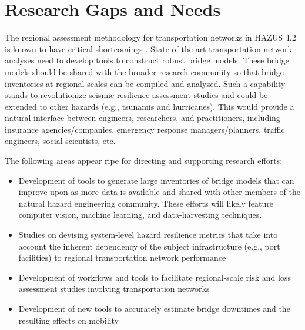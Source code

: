 \section{Research Gaps and Needs}
\label{sec:perf_transport_gaps}

The regional assessment methodology for transportation networks in HAZUS 4.2 is known to have critical shortcomings \citep[e.g.][]{mangalathu2017bridge}. State-of-the-art transportation network analyses need to develop tools to construct robust bridge models. These bridge models should be shared with the broader research community so that bridge inventories at regional scales can be compiled and analyzed. Such a capability stands to revolutionize seismic resilience assessment studies and could be extended to other hazards (e.g., tsunamis and hurricanes). This would provide a natural interface between engineers, researchers, and practitioners, including insurance agencies/companies, emergency response managers/planners, traffic engineers, social scientists, etc. 

The following areas appear ripe for directing and supporting research efforts:
\begin{itemize}
    \item Development of tools to generate large inventories of bridge models that can improve upon as more data is available and shared with other members of the natural hazard engineering community. These efforts will likely feature computer vision, machine learning, and data-harvesting techniques.
    \item Studies on devising system-level hazard resilience metrics that take into account the inherent dependency of the subject infrastructure (e.g., port facilities) to regional transportation network performance
    \item Development of workflows and tools to facilitate regional-scale risk and loss assessment studies involving transportation networks
    \item Development of new tools to accurately estimate bridge downtimes and the resulting effects on mobility
\end{itemize}

